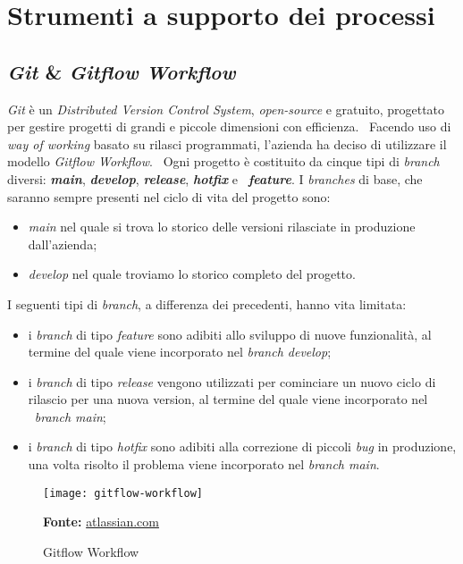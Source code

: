 \section{Strumenti a supporto dei processi}

\subsection{\emph{Git} \& \emph{Gitflow Workflow}}
\emph{Git} è un \emph{Distributed Version Control System}, \emph{open-source} e gratuito, progettato per gestire progetti di grandi e piccole dimensioni con efficienza. \
Facendo uso di \emph{way of working} basato su rilasci programmati, l'azienda ha deciso di utilizzare il modello \emph{Gitflow Workflow}. \
Ogni progetto è costituito da cinque tipi di \emph{branch} diversi: \textbf{\emph{main}}, \textbf{\emph{develop}}, \textbf{\emph{release}}, \textbf{\emph{hotfix}} e \
\textbf{\emph{feature}}. I \emph{branches} di base, che saranno sempre presenti nel ciclo di vita del progetto sono:
\begin{itemize}
  \item \emph{main} nel quale si trova lo storico delle versioni rilasciate in produzione dall'azienda;
  \item \emph{develop} nel quale troviamo lo storico completo del progetto. 
\end{itemize}  

I seguenti tipi di \emph{branch}, a differenza dei precedenti, hanno vita limitata: \
\begin{itemize}
  \item i \emph{branch} di tipo \emph{feature} sono adibiti allo sviluppo di nuove funzionalità, al termine del quale viene incorporato nel \emph{branch develop}; 
  \item i \emph{branch} di tipo \emph{release} vengono utilizzati per cominciare un nuovo ciclo di rilascio per una nuova version, al termine del quale viene incorporato nel \
  \emph{branch main}; 
  \item i \emph{branch} di tipo \emph{hotfix} sono adibiti alla correzione di piccoli \emph{bug} in produzione, una volta risolto il problema viene incorporato nel \emph{branch main}.
\end{itemize}

\vspace{10pt}
  \begin{figure}[!ht]
    \begin{center}
      \texttt{[image: gitflow-workflow]}
      \caption{Gitflow Workflow}
      \textbf{Fonte:} \href{https://www.atlassian.com}{atlassian.com}
    \end{center}
  \end{figure}
\vspace{10pt} 

